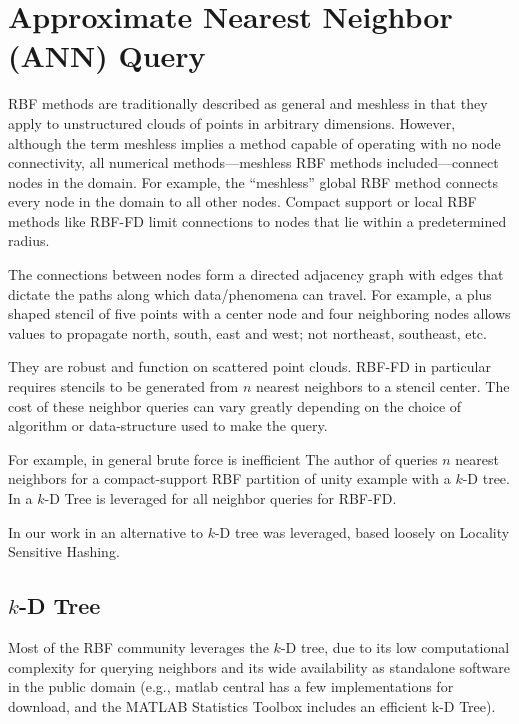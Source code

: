 \documentclass{report}
\begin{document}
{\section{Approximate Nearest Neighbor (ANN) Query}

RBF methods are traditionally described as general and meshless in that they apply to unstructured clouds of points in arbitrary dimensions. However, although the term meshless implies a method capable of operating with no node connectivity, all numerical methods---meshless RBF methods included---connect nodes in the domain. For example, the ``meshless'' global RBF method connects every node in the domain to all other nodes. Compact support or local RBF methods like RBF-FD limit connections to nodes that lie within a predetermined radius.

The connections between nodes form a directed adjacency graph with edges that dictate the paths along which data/phenomena can travel. For example, a plus shaped stencil of five points with a center node and four neighboring nodes allows values to propagate north, south, east and west; not northeast, southeast, etc.


They are robust and function on scattered point clouds. RBF-FD in particular requires stencils to be generated from $n$ nearest neighbors to a stencil center. The cost of these neighbor queries can vary greatly depending on the choice of algorithm or data-structure used to make the query. 

For example, in general brute force is inefficient 
The author of \cite{Fasshauer2007} queries $n$ nearest neighbors for a compact-support RBF partition of unity example with a $k$-D tree. In \cite{FlyerLehto11,FornbergLehto11} a $k$-D Tree is leveraged for all neighbor queries for RBF-FD. 

In our work in \cite{BolligFlyerErlebacher2012} an alternative to $k$-D tree was leveraged, based loosely on Locality Sensitive Hashing.

\subsection{$k$-D Tree}

Most of the RBF community leverages the $k$-D tree, due to its low computational complexity for querying neighbors and its wide availability as standalone software in the public domain (e.g., matlab central has a few implementations for download, and the MATLAB Statistics Toolbox includes an efficient k-D Tree). 

}
\end{document}
